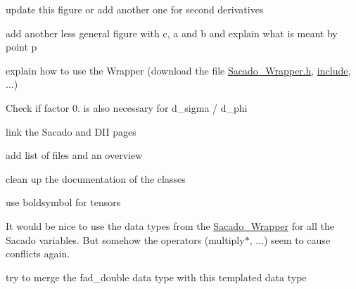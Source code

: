 
\begin{DoxyRefList}
\item[\label{todo__todo000001}%
\hypertarget{todo__todo000001}{}%
page \hyperlink{index}{Trilinos\+:\+:Sacado example documentation} ]update this figure or add another one for second derivatives 

add another less general figure with c, a and b and explain what is meant by point p 

explain how to use the Wrapper (download the file \hyperlink{Sacado__Wrapper_8h}{Sacado\+\_\+\+Wrapper.\+h}, \hyperlink{CMakeCache_8txt_a986ccfc90e04633694fe6cff5472be19}{include}, ...) 

Check if factor 0. is also necessary for d\+\_\+sigma / d\+\_\+phi

link the Sacado and D\+II pages

add list of files and an overview 

clean up the documentation of the classes

use boldsymbol for tensors

It would be nice to use the data types from the \hyperlink{namespaceSacado__Wrapper}{Sacado\+\_\+\+Wrapper} for all the Sacado variables. But somehow the operators (multiply$\ast$, ...) seem to cause conflicts again.

try to merge the fad\+\_\+double data type with this templated data type 
\end{DoxyRefList}
